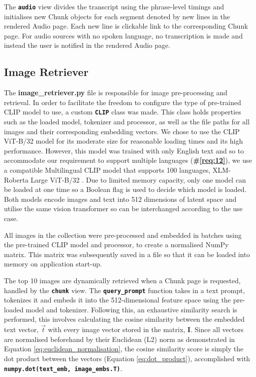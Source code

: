 \documentclass{l4proj}
\begin{document}
The \textbf{\lstinline|audio|} view divides the transcript using the phrase-level timings and initialises new Chunk objects for each segment denoted by new lines in the rendered Audio page. Each new line is clickable link to the corresponding Chunk page. For audio sources with no spoken language, no transcription is made and instead the user is notified in the rendered Audio page.


\subsection{Image Retriever}
The \textbf{image\_retriever.py} file is responsible for image pre-processing and retrieval. In order to facilitate the freedom to configure the type of pre-trained CLIP model to use, a custom \textbf{\lstinline{CLIP}} class was made. This class holds properties such as the loaded model, tokenizer and processor, as well as the file paths for all images and their corresponding embedding vectors. We chose to use the CLIP ViT-B/32 model for its moderate size for reasonable loading times and its high performance. However, this model was trained with only English text and so to accommodate our requirement to support multiple languages (\textbf{\#\ref{req:12}}), we use a compatible Multilingual CLIP model that supports 100 languages, XLM-Roberta Large ViT-B/32 \citep{mclip}. Due to limited memory capacity, only one model can be loaded at one time so a Boolean flag is used to decide which model is loaded. Both models encode images and text into 512 dimensions of latent space and utilise the same vision transformer so can be interchanged according to the use case.

All images in the collection were pre-processed and embedded in batches using the pre-trained CLIP model and processor, to create a normalised NumPy matrix. This matrix was subsequently saved in a file so that it can be loaded into memory on application start-up. 

\label{sec:image_retriever:par:query_prompt}
The top 10 images are dynamically retrieved when a Chunk page is requested, handled by the \textbf{\lstinline{chunk}} view. The \textbf{\lstinline{query_prompt}} function takes in a text prompt, tokenizes it and embeds it into the 512-dimensional feature space using the pre-loaded model and tokenizer. Following this, an exhaustive similarity search is performed, this involves calculating the cosine similarity between the embedded text vector, $\vec{t}$ with every image vector stored in the matrix, $\mathbf{I}$. Since all vectors are normalised beforehand by their Euclidean (L2) norm as demonstrated in Equation \ref{eq:euclidean_normalisation}, the cosine similarity score is simply the dot product between the vectors (Equation \ref{eq:dot_product}), accomplished with \textbf{\lstinline{numpy.dot(text_emb, image_embs.T)}}. 
\end{document}
